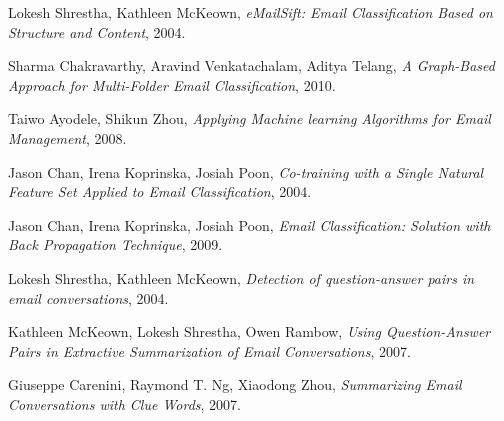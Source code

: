 \documentclass[12pt]{article}
\begin{document}
\begin{thebibliography}{99}
  Lokesh Shrestha,
  Kathleen McKeown,
  \emph{eMailSift: Email Classification Based on Structure and Content},
  2004.

  Sharma Chakravarthy,
  Aravind Venkatachalam,
  Aditya Telang,
  \emph{ A Graph-Based Approach for Multi-Folder Email Classification},
  2010.

  Taiwo Ayodele,
  Shikun Zhou,
  \emph{Applying Machine learning Algorithms for Email Management},
  2008.

  Jason Chan,
  Irena Koprinska,
  Josiah Poon,
  \emph{Co-training with a Single Natural Feature Set Applied to Email Classification},
  2004.

  Jason Chan,
  Irena Koprinska,
  Josiah Poon,
  \emph{Email Classification: Solution with Back Propagation Technique},
  2009.

  Lokesh Shrestha,
  Kathleen McKeown,
  \emph{Detection of question-answer pairs in email conversations},
  2004.

  Kathleen McKeown,
  Lokesh Shrestha,
  Owen Rambow,
  \emph{Using Question-Answer Pairs in Extractive Summarization of Email Conversations},
  2007.

  Giuseppe Carenini,
  Raymond T. Ng,
  Xiaodong Zhou,
  \emph{Summarizing Email Conversations with Clue Words},
  2007.
\end{thebibliography}
\end{document}
